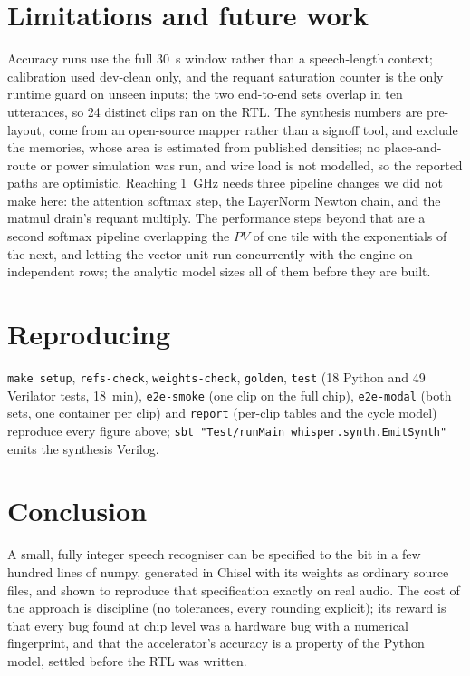 \documentclass[conference]{IEEEtran}
\newcommand{\code}[1]{\texttt{#1}}
\begin{document}
\section{Limitations and future work}
Accuracy runs use the full \SI{30}{s} window rather than a speech-length context; calibration used dev-clean only, and the requant saturation counter is the only runtime guard on unseen inputs; the two end-to-end sets overlap in ten utterances, so 24 distinct clips ran on the RTL. The synthesis numbers are pre-layout, come from an open-source mapper rather than a signoff tool, and exclude the memories, whose area is estimated from published densities; no place-and-route or power simulation was run, and wire load is not modelled, so the reported paths are optimistic. Reaching \SI{1}{GHz} needs three pipeline changes we did not make here: the attention softmax step, the LayerNorm Newton chain, and the matmul drain's requant multiply. The performance steps beyond that are a second softmax pipeline overlapping the $PV$ of one tile with the exponentials of the next, and letting the vector unit run concurrently with the engine on independent rows; the analytic model sizes all of them before they are built.

\section{Reproducing}\label{sec:repro}
\code{make setup}, \code{refs-check}, \code{weights-check}, \code{golden}, \code{test} (18 Python and 49 Verilator tests, \SI{18}{min}), \code{e2e-smoke} (one clip on the full chip), \code{e2e-modal} (both sets, one container per clip) and \code{report} (per-clip tables and the cycle model) reproduce every figure above; \code{sbt "Test/runMain whisper.synth.EmitSynth"} emits the synthesis Verilog.

\section{Conclusion}
A small, fully integer speech recogniser can be specified to the bit in a few hundred lines of numpy, generated in Chisel with its weights as ordinary source files, and shown to reproduce that specification exactly on real audio. The cost of the approach is discipline (no tolerances, every rounding explicit); its reward is that every bug found at chip level was a hardware bug with a numerical fingerprint, and that the accelerator's accuracy is a property of the Python model, settled before the RTL was written.
\end{document}
